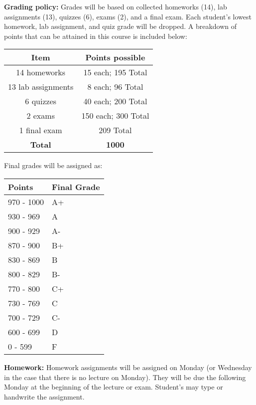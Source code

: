 \documentclass{article}
\begin{document}
\noindent\textbf{Grading policy:} 
Grades will be based on collected homeworks (14), lab assignments (13), quizzes (6), exams (2), and a final exam. Each student's lowest homework, lab assignment, and quiz grade will be dropped. A breakdown of points that can be attained in this course is included below:

\begin{center}
	\begin{tabular}{cc}
		\textbf{Item} & \textbf{Points possible} \\
		\hline
		14 homeworks & 15 each; 195 Total\\
		13 lab assignments & 8 each; 96 Total \\
		6 quizzes & 40 each; 200 Total \\
		2 exams & 150 each; 300 Total \\
		1 final exam & 209 Total \\
		\hline
		\textbf{Total} & \textbf{1000}\\
	\end{tabular}
\end{center}

Final grades will be assigned as:
\begin{center}
	\begin{tabular}{p{2cm}p{2.5cm}}
		\textbf{Points} & \textbf{Final Grade} \\ \hline
		970 - 1000 & A+ \\
		930 - 969 & A \\
		900 - 929 & A- \\
		870 - 900 & B+ \\
		830 - 869 & B \\
		800 - 829 & B- \\
		770 - 800 & C+ \\
		730 - 769 & C \\
		700 - 729 & C- \\
		600 - 699 & D \\
		0 - 599 & F \\ \hline
	\end{tabular}
\end{center}

\noindent\textbf{Homework:} Homework assignments will be assigned on Monday (or Wednesday in the case that there is no lecture on Monday). They will be due the following Monday at the beginning of the lecture or exam. Student's may type or handwrite the assignment. \\
\end{document}
